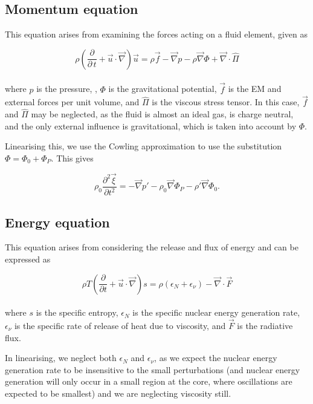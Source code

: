 \documentclass[11pt]{amsart}
\begin{document}
\subsection{Momentum equation}

This equation arises from examining the forces acting on a fluid element, given as

\begin{equation} \rho \left( \frac{\partial}{\partial \, t} +  \vec{u} \cdot \vec{\nabla} \right)
\vec{u} = \rho \vec{f} - \vec{\nabla} p - \rho \vec{\nabla} \Phi + \vec{\nabla} \cdot \hat{\Pi}
\end{equation}
\\
where $p$ is the pressure, , $\Phi$ is the gravitational potential, $\vec{f}$ is
the EM and external forces per unit volume, and $\hat{\Pi}$ is the viscous stress tensor. In this
case, $\vec{f}$ and $\hat{\Pi}$ may be neglected, as the fluid is almost an ideal gas, is charge
neutral, and the only external influence is gravitational, which is taken into account by $\Phi$.

Linearising this, we use the Cowling approximation to use the substitution $\Phi = \Phi_{0} + \Phi_{P}$.
This gives

\begin{equation}
\rho_{0} \frac{\partial^{2} \vec{\xi}}{\partial t^{2}} = - \vec{\nabla} p' - \rho_{0} \vec{\nabla} \Phi_{P}
- \rho' \vec{\nabla} \Phi_{0}.
\end{equation}



\subsection{Energy equation}

This equation arises from considering the release and flux of energy and can be expressed as

\begin{equation}
\rho T \left( \frac{\partial}{\partial t} + \vec{u} \cdot \vec{\nabla} \right) s =
\rho \left( \epsilon_{N} + \epsilon_{\nu} \right) - \vec{\nabla} \cdot \vec{F}
\end{equation}
\\
where $s$ is the specific entropy, $\epsilon_{N}$ is the specific nuclear energy generation rate,
$\epsilon_{\nu}$ is the specific rate of release of heat due to viscosity, and $\vec{F}$ is the radiative flux.

In linearising, we neglect both $\epsilon_{N}$ and $\epsilon_{\nu}$, as we expect the nuclear energy
generation rate to be insensitive to the small perturbations (and nuclear energy generation will only
occur in a small region at the core, where oscillations are expected to be smallest) and we are
neglecting viscosity still.
\end{document}
